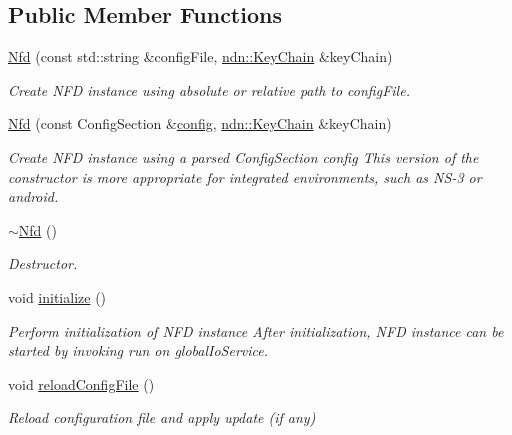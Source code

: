 \subsection*{Public Member Functions}
\begin{DoxyCompactItemize}
\item 
\hyperlink{classnfd_1_1Nfd_a211e8becbe3fe3105bd9de6a0f575b81}{Nfd} (const std\+::string \&config\+File, \hyperlink{classndn_1_1security_1_1KeyChain}{ndn\+::\+Key\+Chain} \&key\+Chain)\hypertarget{classnfd_1_1Nfd_a211e8becbe3fe3105bd9de6a0f575b81}{}\label{classnfd_1_1Nfd_a211e8becbe3fe3105bd9de6a0f575b81}

\begin{DoxyCompactList}\small\item\em Create N\+FD instance using absolute or relative path to {\ttfamily config\+File}. \end{DoxyCompactList}\item 
\hyperlink{classnfd_1_1Nfd_a817ec8458a763866dd847be9d3333e16}{Nfd} (const Config\+Section \&\hyperlink{classconfig}{config}, \hyperlink{classndn_1_1security_1_1KeyChain}{ndn\+::\+Key\+Chain} \&key\+Chain)
\begin{DoxyCompactList}\small\item\em Create N\+FD instance using a parsed Config\+Section {\ttfamily config} This version of the constructor is more appropriate for integrated environments, such as N\+S-\/3 or android. \end{DoxyCompactList}\item 
\hyperlink{classnfd_1_1Nfd_a378e7a2371fddeef8e83648d5fe6bbae}{$\sim$\+Nfd} ()\hypertarget{classnfd_1_1Nfd_a378e7a2371fddeef8e83648d5fe6bbae}{}\label{classnfd_1_1Nfd_a378e7a2371fddeef8e83648d5fe6bbae}

\begin{DoxyCompactList}\small\item\em Destructor. \end{DoxyCompactList}\item 
void \hyperlink{classnfd_1_1Nfd_a1a9f9224facbd45652d51d618060259a}{initialize} ()\hypertarget{classnfd_1_1Nfd_a1a9f9224facbd45652d51d618060259a}{}\label{classnfd_1_1Nfd_a1a9f9224facbd45652d51d618060259a}

\begin{DoxyCompactList}\small\item\em Perform initialization of N\+FD instance After initialization, N\+FD instance can be started by invoking run on global\+Io\+Service. \end{DoxyCompactList}\item 
void \hyperlink{classnfd_1_1Nfd_a3c4b08b8ebf1711d032a64a3a7e89226}{reload\+Config\+File} ()
\begin{DoxyCompactList}\small\item\em Reload configuration file and apply update (if any) \end{DoxyCompactList}\end{DoxyCompactItemize}


